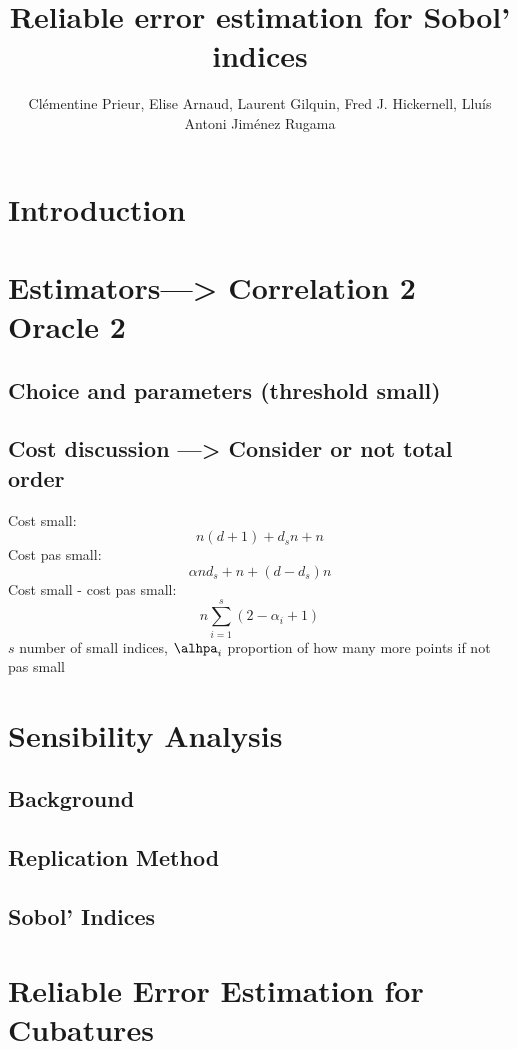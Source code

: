 \documentclass[]{elsarticle}
\theoremstyle{definition}
\begin{document}
\begin{frontmatter}

\title{Reliable error estimation for Sobol' indices}

\author{Cl\'ementine Prieur, Elise Arnaud, Laurent Gilquin, Fred J. Hickernell, Llu\'{i}s Antoni Jim\'{e}nez Rugama}
\address{U. Josef Fourier, Illinois Institute of Technology}
\begin{abstract}
\end{abstract}

\end{frontmatter}

\section{Introduction}

\section{Estimators---> Correlation 2 Oracle 2}
\subsection{Choice and parameters (threshold small)}
\subsection{Cost discussion ---> Consider or not total order}
Cost small:\[n(d+1)+d_sn+n\]
Cost pas small:\[\alpha n d_s +n+(d-d_s)n\]
Cost small - cost pas small: \[n\sum_{i=1}^{s}(2-\alpha_i+1)\] $s$ number of small indices, $\alhpa_i$ proportion of how many more points if not pas small

\section{Sensibility Analysis}
\subsection{Background}
\subsection{Replication Method}
\subsection{Sobol' Indices}

\section{Reliable Error Estimation for Cubatures}
\end{document}
